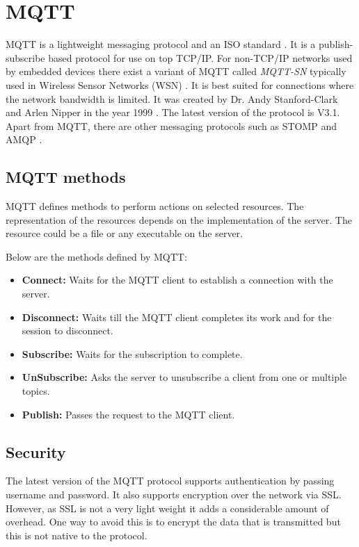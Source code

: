 \section{MQTT}

MQTT is a lightweight messaging protocol \parencite{locke2010mq} and an ISO standard \parencite{mqtt_iso}. It is a publish-subscribe based protocol for use on top TCP/IP. For non-TCP/IP networks used by embedded devices there exist a variant of MQTT called \textit{MQTT-SN} typically used in Wireless Sensor Networks (WSN) \parencite{4554519}. It is best suited for connections where the network bandwidth is limited. It was created by Dr. Andy Stanford-Clark and Arlen Nipper in the year 1999 \parencite{mqtt_faq}. The latest version of the protocol is V3.1. Apart from MQTT, there are other messaging protocols \parencite{messaging_protocols} such as STOMP \parencite{stomp} and AMQP \parencite{vinoski2006advanced}.

\subsection{MQTT methods}

MQTT defines methods to perform actions on selected resources. The representation of the resources depends on the implementation of the server. The resource could be a file or any executable on the server.

Below are the methods defined by MQTT:

\begin{itemize}
    \item\textbf{Connect:}
        Waits for the MQTT client to establish a connection with the server.

    \item\textbf{Disconnect:}
        Waits till the MQTT client completes its work and for the session to disconnect.

    \item\textbf{Subscribe:}
        Waits for the subscription to complete.

    \item\textbf{UnSubscribe:}
        Asks the server to unsubscribe a client from one or multiple topics.

    \item\textbf{Publish:}
        Passes the request to the MQTT client.

\end{itemize}

\subsection{Security}

The latest version of the MQTT protocol supports authentication by passing username and password. It also supports encryption over the network via SSL. However, as SSL is not a very light weight it adds a considerable amount of overhead. One way to avoid this is to encrypt the data that is transmitted but this is not native to the protocol.

